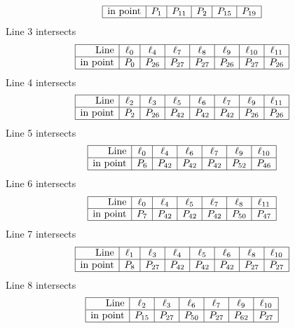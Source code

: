 \documentclass{article}
\begin{document}
{$$\begin{array}{|r*{5}{|c}|}
\hline
\mbox{in point}  & P_{1} & P_{11} & P_{2} & P_{15} & P_{19}\\
\hline
\end{array}
$$
Line 3 intersects 
$$
\begin{array}{|r*{7}{|c}|}
\hline
\mbox{Line}  & \ell_{0} & \ell_{4} & \ell_{7} & \ell_{8} & \ell_{9} & \ell_{10} & \ell_{11}\\
\hline
\mbox{in point}  & P_{0} & P_{26} & P_{27} & P_{27} & P_{26} & P_{27} & P_{26}\\
\hline
\end{array}
$$
Line 4 intersects 
$$
\begin{array}{|r*{7}{|c}|}
\hline
\mbox{Line}  & \ell_{2} & \ell_{3} & \ell_{5} & \ell_{6} & \ell_{7} & \ell_{9} & \ell_{11}\\
\hline
\mbox{in point}  & P_{2} & P_{26} & P_{42} & P_{42} & P_{42} & P_{26} & P_{26}\\
\hline
\end{array}
$$
Line 5 intersects 
$$
\begin{array}{|r*{6}{|c}|}
\hline
\mbox{Line}  & \ell_{0} & \ell_{4} & \ell_{6} & \ell_{7} & \ell_{9} & \ell_{10}\\
\hline
\mbox{in point}  & P_{6} & P_{42} & P_{42} & P_{42} & P_{52} & P_{46}\\
\hline
\end{array}
$$
Line 6 intersects 
$$
\begin{array}{|r*{6}{|c}|}
\hline
\mbox{Line}  & \ell_{0} & \ell_{4} & \ell_{5} & \ell_{7} & \ell_{8} & \ell_{11}\\
\hline
\mbox{in point}  & P_{7} & P_{42} & P_{42} & P_{42} & P_{50} & P_{47}\\
\hline
\end{array}
$$
Line 7 intersects 
$$
\begin{array}{|r*{7}{|c}|}
\hline
\mbox{Line}  & \ell_{1} & \ell_{3} & \ell_{4} & \ell_{5} & \ell_{6} & \ell_{8} & \ell_{10}\\
\hline
\mbox{in point}  & P_{8} & P_{27} & P_{42} & P_{42} & P_{42} & P_{27} & P_{27}\\
\hline
\end{array}
$$
Line 8 intersects 
$$
\begin{array}{|r*{6}{|c}|}
\hline
\mbox{Line}  & \ell_{2} & \ell_{3} & \ell_{6} & \ell_{7} & \ell_{9} & \ell_{10}\\
\hline
\mbox{in point}  & P_{15} & P_{27} & P_{50} & P_{27} & P_{62} & P_{27}\\
\hline
\end{array}
$$}
\end{document}
